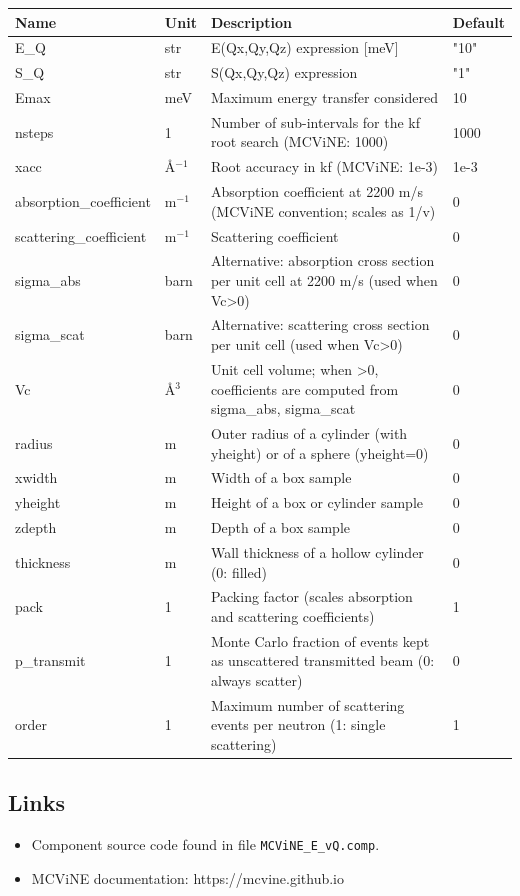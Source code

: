 \begin{longtable}{p{}p{}p{}p{}}
\toprule
\textbf{Name} & \textbf{Unit} & \textbf{Description} & \textbf{Default} \\
\midrule
\endhead
E\_Q & str & E(Qx,Qy,Qz) expression [meV] & "10" \\
S\_Q & str & S(Qx,Qy,Qz) expression & "1" \\
Emax & meV & Maximum energy transfer considered & 10 \\
nsteps & 1 & Number of sub-intervals for the kf root search (MCViNE: 1000) & 1000 \\
xacc & \AA{}$^{-1}$ & Root accuracy in kf (MCViNE: 1e-3) & 1e-3 \\
absorption\_coefficient & m$^{-1}$ & Absorption coefficient at 2200 m/s (MCViNE convention; scales as 1/v) & 0 \\
scattering\_coefficient & m$^{-1}$ & Scattering coefficient & 0 \\
sigma\_abs & barn & Alternative: absorption cross section per unit cell at 2200 m/s (used when Vc\textgreater{}0) & 0 \\
sigma\_scat & barn & Alternative: scattering cross section per unit cell (used when Vc\textgreater{}0) & 0 \\
Vc & \AA{}$^{3}$ & Unit cell volume; when \textgreater{}0, coefficients are computed from sigma\_abs, sigma\_scat & 0 \\
radius & m & Outer radius of a cylinder (with yheight) or of a sphere (yheight=0) & 0 \\
xwidth & m & Width of a box sample & 0 \\
yheight & m & Height of a box or cylinder sample & 0 \\
zdepth & m & Depth of a box sample & 0 \\
thickness & m & Wall thickness of a hollow cylinder (0: filled) & 0 \\
pack & 1 & Packing factor (scales absorption and scattering coefficients) & 1 \\
p\_transmit & 1 & Monte Carlo fraction of events kept as unscattered transmitted beam (0: always scatter) & 0 \\
order & 1 & Maximum number of scattering events per neutron (1: single scattering) & 1 \\
\bottomrule
\end{longtable}

\subsection*{Links}
\begin{itemize}
  \item Component source code found in file \texttt{MCViNE\_E\_vQ.comp}.
  \item MCViNE documentation: https://mcvine.github.io
\end{itemize}
